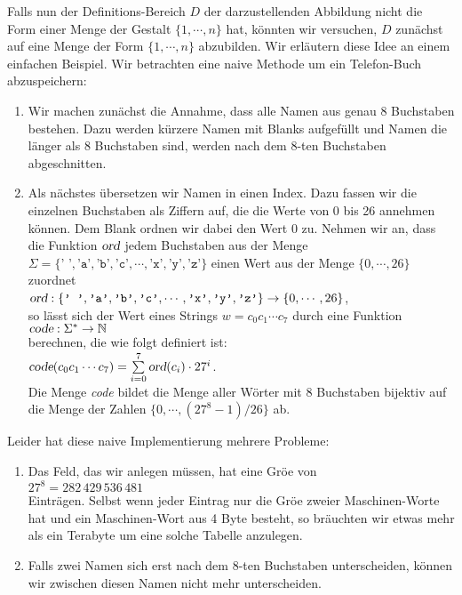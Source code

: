 Falls nun der Definitions-Bereich $D$ der darzustellenden Abbildung nicht die Form einer
Menge der Gestalt $\{1, \cdots, n\}$ hat, 
k\"onnten wir versuchen, $D$ zun\"achst auf eine Menge der Form $\{1,\cdots,n\}$ abzubilden.
Wir erl\"autern diese Idee  an einem einfachen Beispiel.
Wir betrachten eine naive Methode um ein Telefon-Buch abzuspeichern:
\begin{enumerate}
\item Wir machen zun\"achst die Annahme, dass alle Namen aus genau  
      8 Buchstaben bestehen.  Dazu werden
      k\"urzere Namen mit Blanks aufgef\"ullt und Namen die l\"anger als 8 Buchstaben sind,
      werden nach dem  8-ten Buchstaben abgeschnitten.
\item Als n\"achstes \"ubersetzen wir Namen in einen Index.  
      Dazu fassen wir die einzelnen Buchstaben als Ziffern auf, die die Werte von 0 bis 26
      annehmen k\"onnen.  Dem Blank ordnen wir dabei den Wert 0 zu.   Nehmen wir an, dass
      die Funktion $\textsl{ord}$ jedem Buchstaben aus der Menge 
      $\Sigma = \{ \texttt{' '}, \texttt{'a'}, \texttt{'b'}, \texttt{'c'}, \cdots, \texttt{'x'}, \texttt{'y'}, \texttt{'z'} \}$ 
      einen Wert aus der Menge
      $\{0,\cdots,26\}$ zuordnet \\[0.2cm]
      \hspace*{1.3cm} 
      $\textsl{ord}: \{ \texttt{' '}, \texttt{'a'}, \texttt{'b'}, \texttt{'c'}, \cdots, \texttt{'x'}, \texttt{'y'}, \texttt{'z'} \} \rightarrow \{0,\cdots, 26\}$,
      \\[0.2cm]
      so l\"asst sich der Wert eines Strings $w = c_0c_1\cdots c_7$ durch eine Funktion \\[0.2cm]
      \hspace*{1.3cm} 
      $\textsl{code}: \Sigma^* \rightarrow \mathbb{N}$ \\[0.2cm]
      berechnen, die wie folgt definiert ist: \\[0.2cm]
      \hspace*{1.3cm} 
      $\textsl{code}(c_0c_1\cdots c_7) = \sum\limits_{i=0}^7 \textsl{ord}(c_i) \cdot 27^i$.
      \\[0.2cm]
      Die Menge \textsl{code} bildet die Menge aller W\"orter mit 8 Buchstaben bijektiv
      auf die Menge der Zahlen $\{0,\cdots,(27^8 - 1)/26\}$ ab.
\end{enumerate}
Leider hat diese naive Implementierung mehrere Probleme: 
\begin{enumerate}
\item Das Feld, das wir anlegen m\"ussen, hat eine Gr\"o\3e von \\[0.2cm]
      \hspace*{1.3cm} $27^8 = 282\,429\,536\,481$ \\[0.2cm]
      Eintr\"agen.  Selbst wenn jeder Eintrag nur die Gr\"o\3e zweier Maschinen-Worte hat und
      ein Maschinen-Wort aus 4 Byte besteht, so br\"auchten wir 
      etwas mehr als ein Terabyte um eine
      solche Tabelle anzulegen.
\item Falls zwei Namen sich erst nach dem 8-ten Buchstaben unterscheiden, k\"onnen 
      wir zwischen diesen Namen nicht mehr unterscheiden. 
\end{enumerate}
